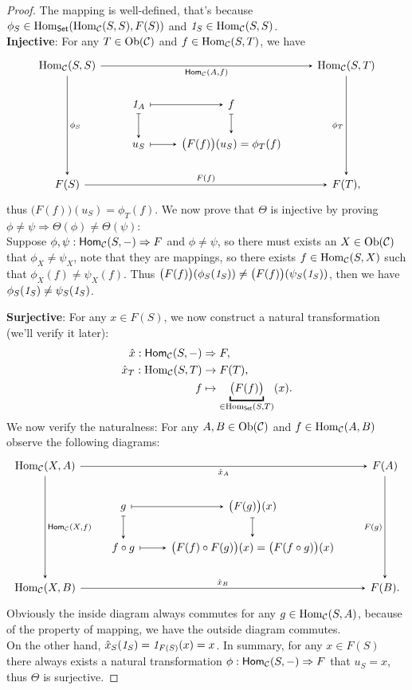 \documentclass{article}
\begin{document}
\begin{proof}
	The mapping is well-defined, that's because $\phi_S\in\mathrm{Hom}_\mathsf{Set}(\mathrm{Hom}_{\mathcal{C}}(S,S),F(S))$ and $\mathit{1}_S\in \mathrm{Hom}_{\mathcal{C}}(S,S)$.\\
	
	\textbf{Injective}: For any $T\in\mathrm{Ob}(\mathcal{C})$ and $f\in\mathrm{Hom}_{\mathcal{C}}(S,T)$, we have
	\[\begin{tikzcd}
		{\Hom_\ca(S,S)} \arrow[->,>=stealth, rrr, "{\mathsf{Hom}_\ca(A,f)}"'] \arrow[->,>=stealth, ddd, "\phi_S"] & & & {\Hom_\ca(S,T)} \arrow[->,>=stealth, ddd, "\phi_T"']\\ &
		\1_A \arrow[->,>=stealth, r, maps to] \arrow[->,>=stealth, d, maps to] & f \arrow[->,>=stealth, d, maps to] & \\ &
		u_S \arrow[->,>=stealth, r, maps to] & \big(F(f)\big)(u_S)=\phi_T(f) & \\
		F(S) \arrow[->,>=stealth, rrr, "F(f)"] & & & F(T),
	\end{tikzcd}\]
	thus $\big(F(f)\big)(u_S)=\phi_T(f)$. We now prove that $\Theta$ is injective by proving $\phi\ne\psi\Longrightarrow\Theta(\phi)\ne\Theta(\psi)$:\\
	Suppose $\phi,\psi:\mathsf{Hom}_{\mathcal{C}}(S,-)\Rightarrow F$ and $\phi\ne\psi$, so there must exists an $X\in\mathrm{Ob}(\mathcal{C})$ that $\phi_X\ne\psi_X$, note that they are mappings, so there exists $f\in\mathrm{Hom}_{\mathcal{C}}(S,X)$ such that $\phi_X(f)\ne\psi_X(f)$. Thus $\big(F(f)\big)(\phi_S(\mathit{1}_S))\ne\big(F(f)\big)(\psi_S(\mathit{1}_S))$, then we have $\phi_S(\mathit{1}_S)\ne\psi_S(\mathit{1}_S)$.
	
	\textbf{Surjective}: For any $x\in F(S)$, we now construct a natural transformation (we'll verify it later):
	\begin{align*}
		\hat x:\mathsf{Hom}_\ca(S,-) & \Rightarrow F,\\
		\hat x_T:\Hom_\ca(S,T) & \to F(T),\\
		f & \mapsto\underbracket{\big(F(f)\big)}_{\in\Hom_\mathsf{Set}(S,T)}(x).
	\end{align*}
	We now verify the naturalness: For any $A,B\in\mathrm{Ob}(\mathcal{C})$ and $f\in\mathrm{Hom}_{\mathcal{C}}(A,B)$ observe the following diagrams:
	\[\begin{tikzcd}
		{\Hom_\ca(X,A)} \arrow[->,>=stealth, rrr, "\hat x_A"'] \arrow[->,>=stealth, ddd, "{\mathsf{Hom}_\ca(X,f)}"] & & & F(A) \arrow[->,>=stealth, ddd, "F(g)"']\\
		& g \arrow[->,>=stealth, r, maps to] \arrow[->,>=stealth, d, maps to] & \big(F(g)\big)(x) \arrow[->,>=stealth, d, maps to] & \\
		& f\circ g \arrow[->,>=stealth, r, maps to] & \big(F(f)\circ F(g)\big)(x)=\big(F(f\circ g)\big)(x) & \\
		{\Hom_\ca(X,B)} \arrow[->,>=stealth, rrr, "\hat x_B"] & & & F(B).
	\end{tikzcd}\]
	Obviously the inside diagram always commutes for any $g\in\mathrm{Hom}_{\mathcal{C}}(S,A)$, because of the property of mapping, we have the outside diagram commutes.\\
	On the other hand, $\hat x_S(\mathit{1}_S)=\mathit{1}_{F(S)}(x)=x$. In summary, for any $x\in F(S)$ there always exists a natural transformation $\phi:\mathsf{Hom}_{\mathcal{C}}(S,-)\Rightarrow F$ that $u_S=x$, thus $\Theta$ is surjective.
	

\end{proof}
\end{document}
